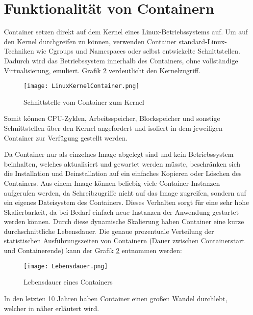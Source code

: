 \section{Funktionalität von Containern}
\label{sec:Funktionalität von Container}
Container setzen direkt auf dem Kernel eines Linux-Betriebssystems auf. Um auf den Kernel durchgreifen zu können, verwenden Container standard-Linux-Techniken wie Cgroups und Namespaces oder selbst entwickelte Schnittstellen. Dadurch wird das Betriebssystem innerhalb des Containers, ohne vollständige Virtualisierung, emuliert. Grafik \ref{fig:HW1} verdeutlicht den Kernelzugriff.
\begin{figure}[H]
	\begin{center}
		\texttt{[image: LinuxKernelContainer.png]}
	\end{center}
	\caption[Schnittstelle vom Container zum Kernel]{Schnittstelle vom Container zum Kernel \footnotemark}
	\label{fig:HW1}
\end{figure}
Somit können CPU-Zyklen, Arbeitsspeicher, Blockspeicher und sonstige Schnittstellen über den Kernel angefordert und isoliert in dem jeweiligen Container zur Verfügung gestellt werden.\cite{12059254020170101}

Da Container nur als einzelnes Image abgelegt sind und kein Betriebssystem beinhalten, welches aktualisiert und gewartet werden müsste, beschränken sich die Installation und Deinstallation auf ein einfaches Kopieren oder Löschen des Containers. 
Aus einem Image können beliebig viele Container-Instanzen aufgerufen werden, da Schreibzugriffe nicht auf das Image zugreifen, sondern auf ein eigenes Dateisystem des Containers. Dieses Verhalten sorgt für eine sehr hohe Skalierbarkeit, da bei Bedarf einfach neue Instanzen der Anwendung gestartet werden können.\cite{12771285120180201}
Durch diese dynamische Skalierung haben Container eine kurze durchschnittliche Lebensdauer. Die genaue prozentuale Verteilung der statistischen Ausführungszeiten von Containern (Dauer zwischen Containerstart und Containerende) kann der Grafik \ref{fig:HW1} entnommen werden:
\begin{figure}[H]
	\begin{center}
		\texttt{[image: Lebensdauer.png]}
	\end{center}
	\caption[Lebensdauer eines Containers]{Lebensdauer eines Containers \footnotemark}
	\label{fig:HW1}
\end{figure}
In den letzten 10 Jahren haben Container einen großen Wandel durchlebt, welcher in  näher erläutert wird.
\newpage